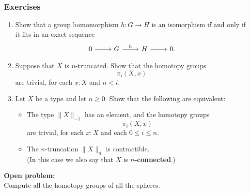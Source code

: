 \documentclass[handout]{beamer}
\newcommand{\trunc}[2]{\|#2\|_{#1}}
\begin{document}
\begin{frame}
  \frametitle{Exercises}
  \begin{enumerate}
  \item Show that a group homomorphism $h:G\to H$ is an isomorphism if and only if it fits in an exact sequence
    \begin{equation*}
      \begin{tikzcd}[ampersand replacement=\&]
        0 \arrow[r] \& G \arrow[r,"h"] \& H \arrow[r] \& 0.
      \end{tikzcd}
    \end{equation*}
  \item Suppose that $X$ is $n$-truncated. Show that the homotopy groups
    \begin{equation*}
      \pi_i(X,x)
    \end{equation*}
    are trivial, for each $x:X$ and $n<i$.
  \item Let $X$ be a type and let $n\geq 0$. Show that the following are equivalent:
    \begin{itemize}
    \item The type $\trunc{-1}{X}$ has an element, and the homotopy groups
      \begin{equation*}
        \pi_i(X,x)
      \end{equation*}
      are trivial, for each $x:X$ and each $0\leq i\leq n$.
    \item The $n$-truncation $\trunc{n}{X}$ is contractible.\\[\baselineskip]
      (In this case we also say that $X$ is \textbf{$n$-connected}.)
    \end{itemize}
  \end{enumerate}
\end{frame}

\begin{frame}
  \textbf{Open problem:}\\
  Compute all the homotopy groups of all the spheres.
\end{frame}
\end{document}
